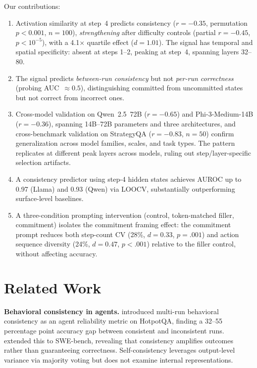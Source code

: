 \documentclass{article}
\begin{document}
Our contributions:
\begin{enumerate}
    \item Activation similarity at step~4 predicts consistency ($r = -0.35$, permutation $p < 0.001$, $n{=}100$), \emph{strengthening} after difficulty controls (partial $r = -0.45$, $p < 10^{-5}$), with a 4.1$\times$ quartile effect ($d = 1.01$). The signal has temporal and spatial specificity: absent at steps 1--2, peaking at step~4, spanning layers 32--80.
    \item The signal predicts \emph{between-run consistency} but not \emph{per-run correctness} (probing AUC~$\approx 0.5$), distinguishing committed from uncommitted states but not correct from incorrect ones.
    \item Cross-model validation on Qwen~2.5~72B ($r = -0.65$) and Phi-3-Medium-14B ($r = -0.36$), spanning 14B--72B parameters and three architectures, and cross-benchmark validation on StrategyQA ($r = -0.83$, $n{=}50$) confirm generalization across model families, scales, and task types. The pattern replicates at different peak layers across models, ruling out step/layer-specific selection artifacts.
    \item A consistency predictor using step-4 hidden states achieves AUROC up to 0.97 (Llama) and 0.93 (Qwen) via LOOCV, substantially outperforming surface-level baselines.
    \item A three-condition prompting intervention (control, token-matched filler, commitment) isolates the commitment framing effect: the commitment prompt reduces both step-count CV (28\%, $d = 0.33$, $p = .001$) and action sequence diversity (24\%, $d = 0.47$, $p < .001$) relative to the filler control, without affecting accuracy.
\end{enumerate}

\section{Related Work}

\textbf{Behavioral consistency in agents.} \citet{anonymous2026a} introduced multi-run behavioral consistency as an agent reliability metric on HotpotQA, finding a 32--55 percentage point accuracy gap between consistent and inconsistent runs. \citet{anonymous2026b} extended this to SWE-bench, revealing that consistency amplifies outcomes rather than guaranteeing correctness. Self-consistency \citep{wang2023selfconsistency} leverages output-level variance via majority voting but does not examine internal representations.
\end{document}
